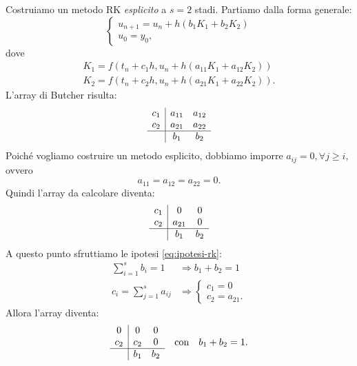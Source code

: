 Costruiamo un metodo RK \textit{esplicito} a $s=2$ stadi. Partiamo dalla forma generale:
\begin{equation*}
\begin{cases}
u_{n+1} =u_{n} +h( b_{1} K_{1} +b_{2} K_{2})\\
u_{0} =y_{0},
\end{cases}
\end{equation*}
dove
\begin{equation}
\begin{aligned}
K_{1} =f( t_{n} +c_{1} h,u_{n} +h( a_{11} K_{1} +a_{12} K_{2}))\\
K_{2} =f( t_{n} +c_{2} h,u_{n} +h( a_{21} K_{1} +a_{22} K_{2})).
\end{aligned}
\label{eq:rk-esplicito-2-stadi-passaggio}
\end{equation}
L'array di Butcher risulta:
\begin{equation*}
\begin{array}{ c|c c }
c_{1} & a_{11} & a_{12}\\
c_{2} & a_{21} & a_{22}\\
\hline
 & b_{1} & b_{2}
\end{array}
\end{equation*}
Poiché vogliamo costruire un metodo esplicito, dobbiamo imporre $a_{ij} =0,\forall j\geqslant i$, ovvero
\begin{equation*}
a_{11} =a_{12} =a_{22} =0.
\end{equation*}
Quindi l'array da calcolare diventa:
\begin{equation*}
\begin{array}{ c|c c }
c_{1} & 0 & 0\\
c_{2} & a_{21} & 0\\
\hline
 & b_{1} & b_{2}
\end{array}
\end{equation*}
A questo punto sfruttiamo le ipotesi \eqref{eq:ipotesi-rk}:
\begin{equation*}
\begin{aligned}
\sum\limits ^{s}_{i=1} b_{i} =1 & \Rightarrow b_{1} +b_{2} =1\\
c_{i} =\sum\limits ^{s}_{j=1} a_{ij} & \Rightarrow \begin{cases}
c_{1} =0\\
c_{2} =a_{21}.
\end{cases}
\end{aligned}
\end{equation*}
Allora l'array diventa:
\begin{equation*}
\begin{array}{ c|c c }
0 & 0 & 0\\
c_{2} & c_{2} & 0\\
\hline
 & b_{1} & b_{2}
\end{array} \quad \text{con} \quad b_{1} +b_{2} =1.
\end{equation*}
